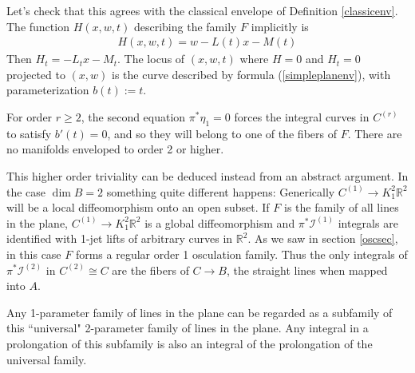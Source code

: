 \documentclass[12pt]{article}
\numberwithin{equation}{section}
\theoremstyle{plain}
\theoremstyle{definition}
\newcommand{\ra}{\rightarrow}
\begin{document}
Let's check that this agrees with the classical envelope of Definition \ref{classicenv}. The function $H(x,w,t)$ describing the family $F$ implicitly is
\begin{align*}
H(x,w,t)=w-L(t)x-M(t)
\end{align*}
Then $H_{t}=-L_{t}x-M_{t}$. The locus of $(x,w,t)$ where $H=0$ and $H_{t}=0$ projected to $(x,w)$ is the curve described by formula (\ref{simpleplanenv}), with parameterization $b(t):=t$.

For order $r\geq 2$, the second equation $\pi^{*}\eta_{1}=0$ forces the integral curves in $C^{(r)}$ to satisfy $b'(t)=0$, and so they will belong to one of the fibers of $F$. There are no manifolds enveloped to order 2 or higher.

This higher order triviality can be deduced instead from an abstract argument. In the case $\dim B=2$ something quite different happens: Generically $C^{(1)}\ra K^{2}_{1}\mathbb{R}^{2}$ will be a local diffeomorphism onto an open subset. If $F$ is the family of all lines in the plane, $C^{(1)}\ra K^{2}_{1}\mathbb{R}^{2}$ is a global diffeomorphism and $\pi^{*}\mathcal{I}^{(1)}$ integrals are identified with 1-jet lifts of arbitrary curves in $\mathbb{R}^{2}$. As we saw in section \ref{oscsec}, in this case $F$ forms a regular order 1 osculation family. Thus the only integrals of $\pi^{*}\mathcal{I}^{(2)}$ in $C^{(2)}\cong C$ are the fibers of $C\ra B$, the straight lines when mapped into $A$.

Any 1-parameter family of lines in the plane can be regarded as a subfamily of this ``universal" 2-parameter family of lines in the plane. Any integral in a prolongation of this subfamily is also an integral of the prolongation of the universal family.
\end{document}
